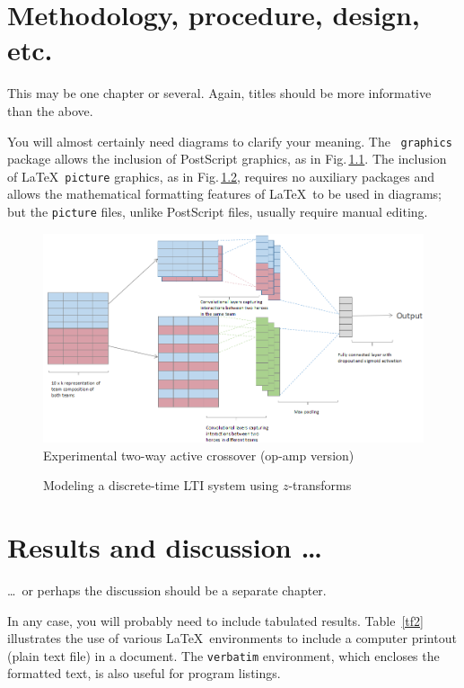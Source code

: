 \documentclass[12pt,openany,a4paper]{book}
\newcommand{\fig}[1]  {Fig.\,\ref{#1}}		%
\newcommand{\tab}[1]  {Table~\ref{#1}}		%
\begin{document}
\chapter{Methodology, procedure, design, etc.}

This may be one chapter or several.  Again, titles should be more
informative than the above.

You will almost certainly need diagrams to clarify your meaning.  The
\LaTeXe\ \texttt{graphics} package allows the inclusion of PostScript
graphics, as in \fig{flr1}.  The inclusion of \LaTeX\ \texttt{picture}
graphics, as in \fig{fzsys}, requires no auxiliary packages and allows
the mathematical formatting features of \LaTeX\ to be used in
diagrams; but the \texttt{picture} files, unlike PostScript files,
usually require manual editing.

\begin{figure}[htbp]
\centerline{\includegraphics{architecture.png}}
\caption{Experimental two-way active crossover (op-amp version)}
\label{flr1}
\end{figure}

\begin{figure}[htbp]
\caption{Modeling a discrete-time LTI system using $z$-transforms}
\label{fzsys}
\end{figure}

\chapter{Results and discussion \ldots}

\ldots\ or perhaps the discussion should be a separate chapter.

In any case, you will probably need to include tabulated results.
\tab{tf2} illustrates the use of various \LaTeX\ environments to
include a computer printout (plain text file) in a document.  The
\texttt{verbatim} environment, which encloses the formatted text, is
also useful for program listings.
\end{document}
